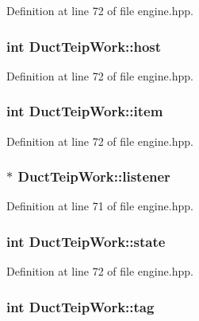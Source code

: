 Definition at line 72 of file engine.hpp.\hypertarget{struct_duct_teip_work_a7fb8353e7ff6b2220a802588bc2ef0ca}{
\subsubsection[{host}]{\setlength{\rightskip}{0pt plus 5cm}int {\bf DuctTeipWork::host}}}
\label{struct_duct_teip_work_a7fb8353e7ff6b2220a802588bc2ef0ca}


Definition at line 72 of file engine.hpp.\hypertarget{struct_duct_teip_work_aa67fbaa4465bd6a7ce6bc560204ca73a}{
\subsubsection[{item}]{\setlength{\rightskip}{0pt plus 5cm}int {\bf DuctTeipWork::item}}}
\label{struct_duct_teip_work_aa67fbaa4465bd6a7ce6bc560204ca73a}


Definition at line 72 of file engine.hpp.\hypertarget{struct_duct_teip_work_a2e8cae616400fd90ec9580d9df558890}{
\subsubsection[{listener}]{$\ast$ {\bf DuctTeipWork::listener}}}
\label{struct_duct_teip_work_a2e8cae616400fd90ec9580d9df558890}


Definition at line 71 of file engine.hpp.\hypertarget{struct_duct_teip_work_acd36f1d6cc9b69134ec503adaf6465c5}{
\subsubsection[{state}]{\setlength{\rightskip}{0pt plus 5cm}int {\bf DuctTeipWork::state}}}
\label{struct_duct_teip_work_acd36f1d6cc9b69134ec503adaf6465c5}


Definition at line 72 of file engine.hpp.\hypertarget{struct_duct_teip_work_ac48f5639d353e33cedf01eb9fb482e2c}{
\subsubsection[{tag}]{\setlength{\rightskip}{0pt plus 5cm}int {\bf DuctTeipWork::tag}}}
\label{struct_duct_teip_work_ac48f5639d353e33cedf01eb9fb482e2c}


